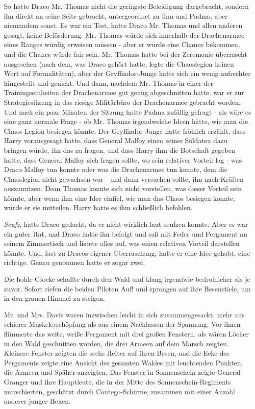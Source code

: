 So hatte Draco Mr. Thomas nicht die geringste Beleidigung dargebracht, sondern
ihn direkt an seine Seite gebracht, untergeordnet zu ihm und Padma, aber
niemandem sonst. Es war ein Test, hatte Draco Mr. Thomas und allen anderen
gesagt, keine Beförderung. Mr. Thomas würde sich innerhalb der Drachenarmee
eines Ranges würdig erweisen müssen - aber er würde eine Chance bekommen, und
die Chance würde fair sein. Mr. Thomas hatte bei der Zeremonie überrascht
ausgesehen (nach dem, was Draco gehört hatte, legte die Chaoslegion keinen Wert
auf Formalitäten), aber der Gryffindor-Junge hatte sich ein wenig aufrechter
hingestellt und genickt. Und dann, nachdem Mr. Thomas in einer der
Trainingseinheiten der Drachenarmee gut genug abgeschnitten hatte, war er zur
Strategiesitzung in das riesige Militärbüro der Drachenarmee gebracht worden.
Und nach ein paar Minuten der Sitzung hatte Padma zufällig gefragt - als wäre es
eine ganz normale Frage - ob Mr. Thomas irgendwelche Ideen hätte, wie man die
Chaos Legion besiegen könnte. Der Gryffindor-Junge hatte fröhlich erzählt, dass
Harry vorausgesagt hatte, dass General Malfoy einen seiner Soldaten dazu bringen
würde, ihn das zu fragen, und dass Harry ihm die Botschaft gegeben hatte, dass
General Malfoy sich fragen sollte, wo sein relativer Vorteil lag - was Draco
Malfoy tun konnte oder was die Drachenarmee tun konnte, dem die Chaoslegion
nicht gewachsen war - und dann versuchen sollte, ihn nach Kräften auszunutzen.
Dean Thomas konnte sich nicht vorstellen, was dieser Vorteil sein könnte, aber
wenn ihm eine Idee einfiel, wie man das Chaos besiegen konnte, würde er sie
mitteilen. Harry hatte es ihm schließlich befohlen.

\emph{Seufz}, hatte Draco gedacht, da er nicht wirklich laut seufzen konnte.
Aber es war ein guter Rat, und Draco hatte ihn befolgt und saß mit Feder und
Pergament an seinem Zimmertisch und listete alles auf, was einen relativen
Vorteil darstellen könnte. Und, fast zu Dracos eigener Überraschung, hatte er
eine Idee gehabt, eine richtige. Genau genommen hatte er sogar zwei.

Die hohle Glocke schallte durch den Wald und klang irgendwie bedrohlicher als je
zuvor. Sofort riefen die beiden Piloten \glqq Auf!\grqq{} und sprangen auf ihre
Besenstiele, um in den grauen Himmel zu steigen.

Mr. und Mrs. Davis waren inzwischen leicht in sich zusammengesackt, mehr aus
schierer Muskelerschöpfung als aus einem Nachlassen der Spannung. Vor ihnen
flimmerte das weite, weiße Pergament mit drei großen Fenstern, als wären Löcher
in den Wald geschnitten worden, die drei Armeen auf dem Marsch zeigten. Kleinere
Fenster zeigten die sechs Reiter auf ihren Besen, und die Ecke des Pergaments
zeigte eine Ansicht des gesamten Waldes mit leuchtenden Punkten, die Armeen und
Späher anzeigten. Das Fenster in Sonnenschein zeigte General Granger und ihre
Hauptleute, die in der Mitte des Sonnenschein-Regiments marschierten, geschützt
durch Contego-Schirme, zusammen mit einer Anzahl anderer junger Hexen.

